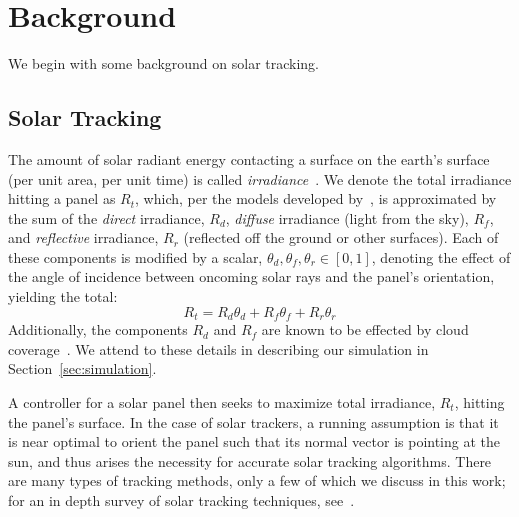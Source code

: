\documentclass{article}
\begin{document}
\section{Background}

We begin with some background on solar tracking.

\subsection{Solar Tracking}
The amount of solar radiant energy contacting a surface on the earth's surface (per unit area, per unit time) is called {\it irradiance}~\cite{goswami2000principles}.  We denote the total irradiance hitting a panel as $R_t$, which, per the models developed by~\citet{kamali2006estimating}, is approximated by the sum of the {\it direct} irradiance, $R_d$, {\it diffuse} irradiance (light from the sky), $R_f$, and {\it reflective} irradiance, $R_r$ (reflected off the ground or other surfaces). Each of these components is modified by a scalar, $\theta_d, \theta_f, \theta_r \in [0,1]$, denoting the effect of the angle of incidence between oncoming solar rays and the panel's orientation, yielding the total:
\begin{equation}
R_t = R_d \theta_d + R_f \theta_f + R_r \theta_r
\label{eq:total_rads}
\end{equation}
Additionally, the components $R_d$ and $R_f$ are known to be effected by cloud coverage~\cite{li2004overcast,pfister2003cloud,tzoumanikas2016effect}. We attend to these details in describing our simulation in Section~\ref{sec:simulation}.

A controller for a solar panel then seeks to maximize total irradiance, $R_t$, hitting the panel's surface. In the case of solar trackers, a running assumption is that it is near optimal to orient the panel such that its normal vector is pointing at the sun, and thus arises the necessity for accurate solar tracking algorithms. There are many types of tracking methods, only a few of which we discuss in this work; for an in depth survey of solar tracking techniques, see~\citet{mousazadeh2009review}.
\end{document}
